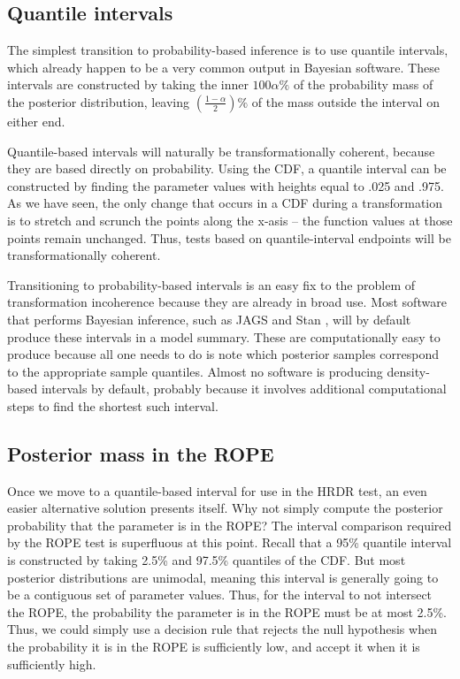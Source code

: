 \documentclass[9pt,twocolumn,twoside]{cidlab-draft}\templatetype{cidlab-invited}
\newcommand{\hdr}{HRDR}
\begin{document}
\subsection*{Quantile intervals}

The simplest transition to probability-based inference is to use quantile intervals, which already happen to be a very common output in Bayesian software.  These intervals are constructed by taking the inner $100\alpha\%$ of the probability mass of the posterior distribution, leaving $\left(\frac{1-\alpha}{2}\right)\!\!\%$ of the mass outside the interval on either end. 

Quantile-based intervals will naturally be transformationally coherent, because they are based directly on probability. Using the CDF, a quantile interval can be constructed by finding the parameter values with heights equal to .025 and .975. As we have seen, the only change that occurs in a CDF during a transformation is to stretch and scrunch the points along the x-asis -- the function values at those points remain unchanged. Thus, tests based on quantile-interval endpoints will be transformationally coherent.

Transitioning to probability-based intervals is an easy fix to the problem of transformation incoherence because they are already in broad use. Most software that performs Bayesian inference, such as JAGS \cite{Plummer2003} and Stan \cite{carpenter2017stan}, will by default produce these intervals in a model summary. These are computationally easy to produce because all one needs to do is note which posterior samples correspond to the appropriate sample quantiles. Almost no software is producing density-based intervals by default, probably because it involves additional computational steps to find the shortest such interval.


\subsection*{Posterior mass in the ROPE}

Once we move to a quantile-based interval for use in the \hdr{} test, an even easier alternative solution presents itself. Why not simply compute the posterior probability that the parameter is in the ROPE? The interval comparison required by the ROPE test is superfluous at this point. Recall that a 95\% quantile interval is constructed by taking 2.5\% and 97.5\% quantiles of the CDF. But most posterior distributions are unimodal, meaning this interval is generally going to be a contiguous set of parameter values. Thus, for the interval to not intersect the ROPE, the probability the parameter is in the ROPE must be at most 2.5\%. Thus, we could simply use a decision rule that rejects the null hypothesis when the probability it is in the ROPE is sufficiently low, and accept it when it is sufficiently high. 
\end{document}
